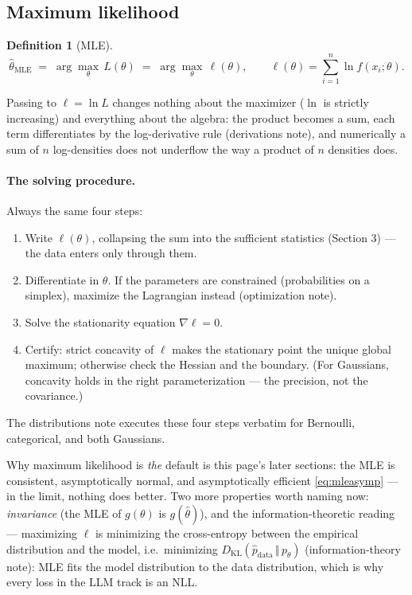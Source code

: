 \documentclass[11pt]{article}
\newtheorem{definition}{Definition}
\begin{document}
\subsection{Maximum likelihood}

\begin{definition}[MLE]
\begin{equation}
  \hat\theta_{\mathrm{MLE}} \;=\; \arg\max_{\theta}\, L(\theta)
  \;=\; \arg\max_{\theta}\, \ell(\theta),
  \qquad
  \ell(\theta) = \sum_{i=1}^{n} \ln f(x_i;\theta).
  \label{eq:mledef}
\end{equation}
\end{definition}

Passing to $\ell = \ln L$ changes nothing about the maximizer ($\ln$ is
strictly increasing) and everything about the algebra: the product
becomes a sum, each term differentiates by the log-derivative rule
(derivations note), and numerically a sum of $n$ log-densities does not
underflow the way a product of $n$ densities does.

\paragraph{The solving procedure.} Always the same four steps:
\begin{enumerate}
  \item Write $\ell(\theta)$, collapsing the sum into the sufficient
    statistics (Section 3) --- the data enters only through them.
  \item Differentiate in $\theta$. If the parameters are constrained
    (probabilities on a simplex), maximize the Lagrangian instead
    (optimization note).
  \item Solve the stationarity equation $\nabla \ell = 0$.
  \item Certify: strict concavity of $\ell$ makes the stationary point
    the unique global maximum; otherwise check the Hessian and the
    boundary. (For Gaussians, concavity holds in the right
    parameterization --- the precision, not the covariance.)
\end{enumerate}
The distributions note executes these four steps verbatim for
Bernoulli, categorical, and both Gaussians.

Why maximum likelihood is \emph{the} default is this page's later
sections: the MLE is consistent, asymptotically normal, and
asymptotically efficient \eqref{eq:mleasymp} --- in the limit, nothing
does better. Two more properties worth naming now: \emph{invariance}
(the MLE of $g(\theta)$ is $g(\hat\theta)$), and the
information-theoretic reading --- maximizing $\ell$ is minimizing the
cross-entropy between the empirical distribution and the model, i.e.\
minimizing $D_{\mathrm{KL}}(\hat p_{\mathrm{data}} \,\Vert\,
p_\theta)$ (information-theory note): MLE fits the model distribution
to the data distribution, which is why every loss in the LLM track is
an NLL.
\end{document}
